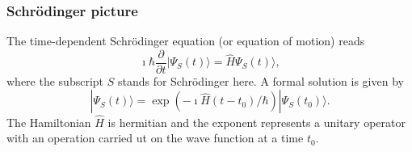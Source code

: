 











\frame
{
\frametitle{Schr\"odinger picture}
\begin{small}
{\scriptsize
The time-dependent Schr\"odinger equation (or equation of motion) reads
\[
\imath \hbar\frac{\partial }{\partial t}|\Psi_S(t)\rangle = \hat{H}\Psi_S(t)\rangle,
\]
where the subscript $S$ stands for Schr\"odinger here.
A formal solution is given by 
\[
|\Psi_S(t)\rangle = \exp{(-\imath\hat{H}(t-t_0)/\hbar)}|\Psi_S(t_0)\rangle.
\]
The Hamiltonian $\hat{H}$ is hermitian and the exponent represents a unitary 
operator with an operation carried ut on the wave function at a time $t_0$.
}
\end{small}
}

